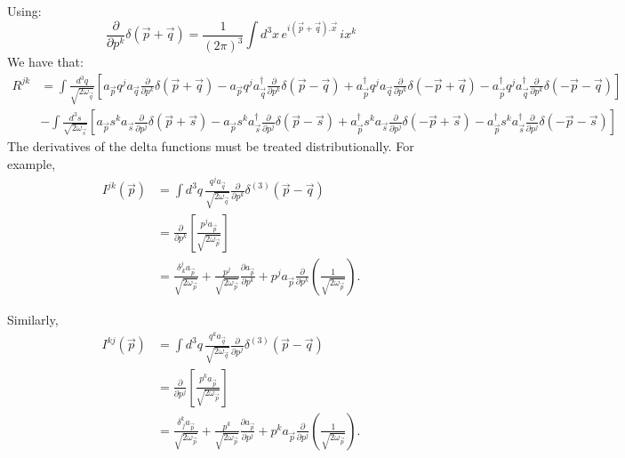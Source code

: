\documentclass{article}
\newcommand{\asp}{a_{\vec{p}}}
\newcommand{\ass}{a_{\vec{s}}}
\newcommand{\asq}{a_{\vec{q}}}
\newcommand{\adp}{a_{\vec{p}}^\dagger}
\newcommand{\adq}{a_{\vec{q}}^\dagger}
\newcommand{\ads}{a_{\vec{s}}^\dagger}
\newcommand{\vecx}{\vec{x}}
\newcommand{\vecp}{\vec{p}}
\newcommand{\vecq}{\vec{q}}
\newcommand{\vecs}{\vec{s}}
\begin{document}
Using:
$$
\frac{\partial}{\partial p^k}\delta(\vecp + \vecq)=\frac{1}{(2\pi)^3}\int d^3x \, e^{i(\vecp + \vecq).\vecx}\,ix^k
$$    
We have that:
\begin{equation}
\begin{split}
    R^{jk} & = \int \frac{d^3q}{\sqrt{2\omega_{\vecq}}}[\asp q^j\asq\frac{\partial}{\partial p^k}\delta(\vecp + \vecq) -\asp q^j\adq \frac{\partial}{\partial p^k}\delta(\vecp - \vecq)+\adp q^j\asq \frac{\partial}{\partial p^k}\delta(-\vecp + \vecq) - \adp q^j\adq \frac{\partial}{\partial p^k}\delta(-\vecp - \vecq)]\\
    & -\int \frac{d^3s}{\sqrt{2\omega_{\vecs}}}[\asp s^k\ass\frac{\partial}{\partial p^j}\delta(\vecp + \vecs) -\asp s^k\ads \frac{\partial}{\partial p^j}\delta(\vecp - \vecs)+\adp s^k\ass \frac{\partial}{\partial p^j}\delta(-\vecp + \vecs) - \adp s^k\ads \frac{\partial}{\partial p^j}\delta(-\vecp - \vecs)]
    \end{split}
\end{equation}
The derivatives of the delta functions must be treated distributionally. For example,
\begin{equation}
\begin{split}
I^{jk}(\vec p)
&=
\int d^3q\,
\frac{q^j a_{\vec q}}{\sqrt{2\omega_{\vec q}}}
\frac{\partial}{\partial p^k}
\delta^{(3)}(\vec p-\vec q)
\\
&=
\frac{\partial}{\partial p^k}
\left[
\frac{p^j a_{\vec p}}{\sqrt{2\omega_{\vec p}}}
\right]
\\
&=
\frac{\delta^j_{\ k}a_{\vec p}}{\sqrt{2\omega_{\vec p}}}
+
\frac{p^j}{\sqrt{2\omega_{\vec p}}}
\frac{\partial a_{\vec p}}{\partial p^k}
+
p^j a_{\vec p}
\frac{\partial}{\partial p^k}
\left(
\frac{1}{\sqrt{2\omega_{\vec p}}}
\right).
\end{split}
\end{equation}

Similarly,
\begin{equation}
\begin{split}
I^{kj}(\vec p)
&=
\int d^3q\,
\frac{q^k a_{\vec q}}{\sqrt{2\omega_{\vec q}}}
\frac{\partial}{\partial p^j}
\delta^{(3)}(\vec p-\vec q)
\\
&=
\frac{\partial}{\partial p^j}
\left[
\frac{p^k a_{\vec p}}{\sqrt{2\omega_{\vec p}}}
\right]
\\
&=
\frac{\delta^k_{\ j}a_{\vec p}}{\sqrt{2\omega_{\vec p}}}
+
\frac{p^k}{\sqrt{2\omega_{\vec p}}}
\frac{\partial a_{\vec p}}{\partial p^j}
+
p^k a_{\vec p}
\frac{\partial}{\partial p^j}
\left(
\frac{1}{\sqrt{2\omega_{\vec p}}}
\right).
\end{split}
\end{equation}
\end{document}
